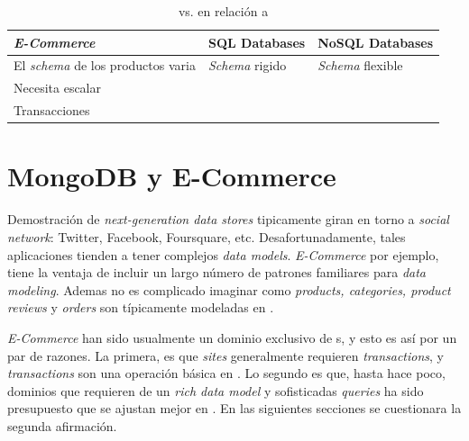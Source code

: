 	




\begin{table}[h!]
    \tiny
   
\begin{tabular}{ |L{0.1\paperwidth}|L{0.3\paperwidth}|L{0.3\paperwidth}|}
\hline
	\textit{E-Commerce}&
	SQL Databases &
	NoSQL Databases
 
\\ \hline
	El \textit{schema} de los productos varia&
	\textit{Schema} rigido&
	\textit{Schema} flexible
\\ \hline
	Necesita escalar&
	&
	
\\ \hline
	Transacciones&
	&
	
\\ \hline
\end{tabular}
    \caption{  vs.  en relación a \textit{}}
    \label{tab:SQL_vs_noSQL_summary}
\end{table}


\section{MongoDB y E-Commerce \cite{online_mongodb_ecommerce}}\label{cap:estadoArte:MongoDB_ECommerce}

Demostración de \textit{next-generation data stores} tipicamente giran en torno a \textit{social network}: Twitter, Facebook, Foursquare, etc. Desafortunadamente, tales aplicaciones tienden a tener complejos \textit{data models}. \textit{E-Commerce} por ejemplo, tiene la ventaja de incluir un largo número de patrones familiares para \textit{data modeling}. Ademas no es complicado imaginar como \textit{products, categories, product reviews} y \textit{orders} son típicamente modeladas en .

\textit{E-Commerce} han sido usualmente un dominio exclusivo de s, y esto es así por un par de razones. La primera, es que \textit{ sites} generalmente requieren \textit{transactions}, y \textit{transactions} son una operación básica en . Lo segundo es que, hasta hace poco, dominios que requieren de un \textit{rich data model} y sofisticadas \textit{queries} ha sido presupuesto que se ajustan mejor en . En las siguientes secciones se cuestionara la segunda afirmación. 

